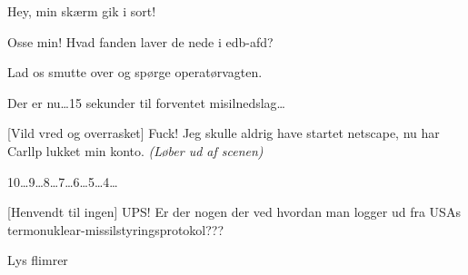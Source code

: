 \documentclass[10pt]{article}
\begin{document}
\begin{sketch}
 Hey, min skærm gik i sort!

 Osse min! Hvad fanden laver de nede i edb-afd?

 Lad os smutte over og spørge operatørvagten.


 Der er nu\ldots 15 sekunder til forventet misilnedslag\ldots

[Vild vred og overrasket] Fuck! Jeg skulle aldrig have startet
netscape, nu har Carllp lukket min konto. {\em (Løber ud af scenen)}

 10\ldots 9\ldots 8\ldots 7\ldots 6\ldots 5\ldots 4\ldots

 [Henvendt til ingen] UPS! Er der nogen der ved hvordan man logger ud fra USAs
ter\-mo\-nu\-kle\-ar-mis\-sil\-sty\-rings\-pro\-to\-kol???

\scene Lys flimrer

\end{sketch}
\end{document}
